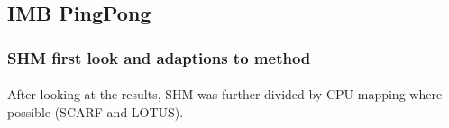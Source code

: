 \documentclass{article}
\begin{document}
    \subsection{IMB PingPong}

        \subsubsection{SHM first look and adaptions to method}
            \label{subsubsection:SHM-first-look}

            \paragraph{}
            After looking at the results, SHM was further divided by CPU mapping where possible (SCARF and LOTUS).
\end{document}
